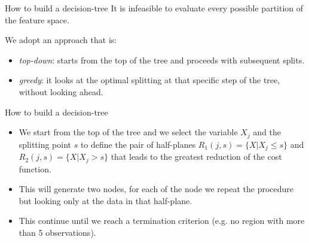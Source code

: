 \documentclass[notes]{beamer}          %
\begin{document}
\begin{frame}{How to build a decision-tree}
It is infeasible to evaluate every possible partition of the feature space.

\vspace{0.5cm}
We adopt an approach that is:
\begin{itemize}
	\item \textit{top-down}: starts from the top of the tree and proceeds with subsequent splits.
	\item \textit{greedy}: it looks at the optimal splitting at that specific step of the tree, without looking ahead. 
\end{itemize}
\end{frame}

\begin{frame}{How to build a decision-tree}
\begin{itemize}
	\item We start from the top of the tree and we select the variable $X_j$ and the splitting point $s$ to define the pair of half-planes $R_1(j,s)=\{X|X_j \le s\}$ and $R_2(j,s)=\{X|X_j > s\}$ that leads to the greatest reduction of the cost function.
	\item This will generate two nodes, for each of the node we repeat the procedure but looking only at the data in that half-plane. 
	\item This continue until we reach a termination criterion (e.g. no region with more than 5 observations).
\end{itemize}	

\end{frame}
\end{document}
